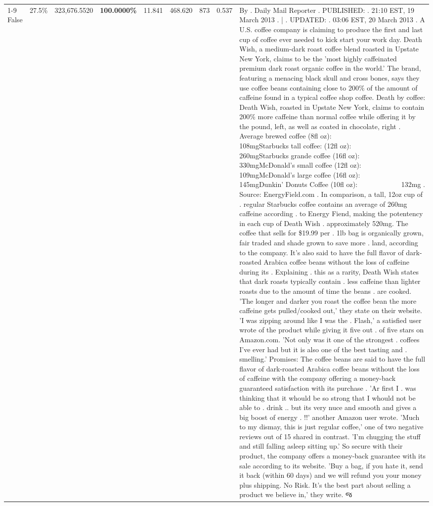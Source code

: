 \begin{table}[H]
{\begin{tabular}{lllrlllll}
\cline{1-9}
False & 27.5\% & 323,676.5520 & \bfseries \color{red} 100.0000\% & 11.841 & 468.620 & 873 & 0.537 & By . Daily Mail Reporter . PUBLISHED: . 21:10 EST, 19 March 2013 . | . UPDATED: . 03:06 EST, 20 March 2013 . A U.S. coffee company is claiming to produce the first and last cup of coffee ever needed to kick start your work day. Death Wish, a medium-dark roast coffee blend roasted in Upstate New York, claims to be the 'most highly caffeinated premium dark roast organic coffee in the world.' The brand, featuring a menacing black skull and cross bones, says they use coffee beans containing close to 200\% of the amount of caffeine found in a typical coffee shop coffee. Death by coffee: Death Wish, roasted in Upstate New York, claims to contain 200\% more caffeine than normal coffee while offering it by the pound, left, as well as coated in chocolate, right . Average brewed coffee (8fl oz):              108mgStarbucks tall coffee: (12fl oz):                260mgStarbucks grande coffee (16fl oz):         330mgMcDonald's small coffee (12fl oz):           109mgMcDonald's large coffee (16fl oz):           145mgDunkin' Donuts Coffee (10fl oz):             132mg . Source: EnergyField.com . In comparison, a tall, 12oz cup of . regular Starbucks coffee contains an average of 260mg caffeine according . to Energy Fiend, making the potentency in each cup of Death Wish . approximately 520mg. The coffee that sells for \$19.99 per . 1lb bag is organically grown, fair traded and shade grown to save more . land, according to the company. It's also said to have the full flavor of dark-roasted Arabica coffee beans without the loss of caffeine during its . Explaining . this as a rarity, Death Wish states that dark roasts typically contain . less caffeine than lighter roasts due to the amount of time the beans . are cooked. 'The longer and darker you roast the coffee bean the more caffeine gets pulled/cooked out,' they state on their website. 'I was zipping around like I was the . Flash,' a satisfied user wrote of the product while giving it five out . of five stars on Amazon.com. 'Not only was it one of the strongest . coffees I've ever had but it is also one of the best tasting and . smelling.’ Promises: The coffee beans are said to have the full flavor of dark-roasted Arabica coffee beans without the loss of caffeine with the company offering a money-back guaranteed satisfaction with its purchase . 'Ar first I . was thinking that it whould be so strong that I whould not be able to . drink .. but its very nuce and smooth and gives a big boost of energy . !!' another Amazon user wrote. 'Much to my dismay, this is just regular coffee,' one of two negative reviews out of 15 shared in contrast. 'I'm chugging the stuff and still falling asleep sitting up.' So secure with their product, the company offers a money-back guarantee with its sale according to its website. 'Buy a bag, if you hate it, send it back (within 60 days) and we will refund you your money plus shipping. No Risk. It’s the best part about selling a product we believe in,' they write. જ \\

\end{tabular}}
\end{table}
